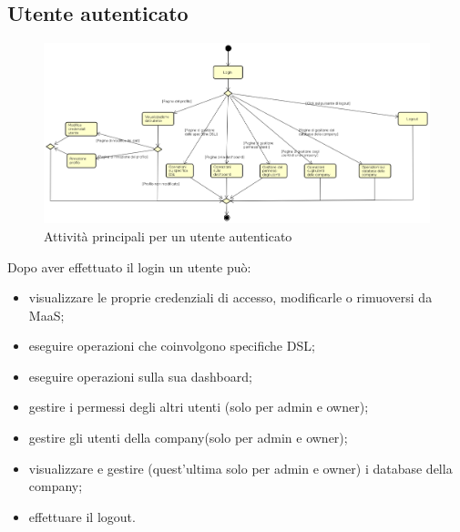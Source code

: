 \subsection{Utente autenticato}
\begin{figure}[H]
\begin{center}
\includegraphics[width=18cm,angle=90]{res/sections/backend/activities/principaliConAuth.png}
\caption{Attività principali per un utente autenticato}
\end{center}
\end{figure}
Dopo aver effettuato il login un utente può:
\begin{itemize}
\item visualizzare le proprie credenziali di accesso, modificarle o rimuoversi da MaaS;
\item eseguire operazioni che coinvolgono specifiche DSL;
\item eseguire operazioni sulla sua dashboard;
\item gestire i permessi degli altri utenti (solo per admin e owner);
\item gestire gli utenti della company(solo per admin e owner);
\item visualizzare e gestire (quest'ultima solo per admin e owner) i database della company;
\item effettuare il logout.
\end{itemize}
